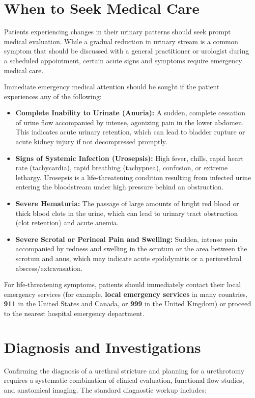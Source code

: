 \section*{When to Seek Medical Care}
Patients experiencing changes in their urinary patterns should seek prompt medical evaluation. While a gradual reduction in urinary stream is a common symptom that should be discussed with a general practitioner or urologist during a scheduled appointment, certain acute signs and symptoms require emergency medical care.

Immediate emergency medical attention should be sought if the patient experiences any of the following:
\begin{itemize}
  \item \textbf{Complete Inability to Urinate (Anuria):} A sudden, complete cessation of urine flow accompanied by intense, agonizing pain in the lower abdomen. This indicates acute urinary retention, which can lead to bladder rupture or acute kidney injury if not decompressed promptly.
  \item \textbf{Signs of Systemic Infection (Urosepsis):} High fever, chills, rapid heart rate (tachycardia), rapid breathing (tachypnea), confusion, or extreme lethargy. Urosepsis is a life-threatening condition resulting from infected urine entering the bloodstream under high pressure behind an obstruction.
  \item \textbf{Severe Hematuria:} The passage of large amounts of bright red blood or thick blood clots in the urine, which can lead to urinary tract obstruction (clot retention) and acute anemia.
  \item \textbf{Severe Scrotal or Perineal Pain and Swelling:} Sudden, intense pain accompanied by redness and swelling in the scrotum or the area between the scrotum and anus, which may indicate acute epididymitis or a periurethral abscess/extravasation.
\end{itemize}

For life-threatening symptoms, patients should immediately contact their local emergency services (for example, \textbf{local emergency services} in many countries, \textbf{911} in the United States and Canada, or \textbf{999} in the United Kingdom) or proceed to the nearest hospital emergency department.

\section*{Diagnosis and Investigations}
Confirming the diagnosis of a urethral stricture and planning for a urethrotomy requires a systematic combination of clinical evaluation, functional flow studies, and anatomical imaging. The standard diagnostic workup includes:

